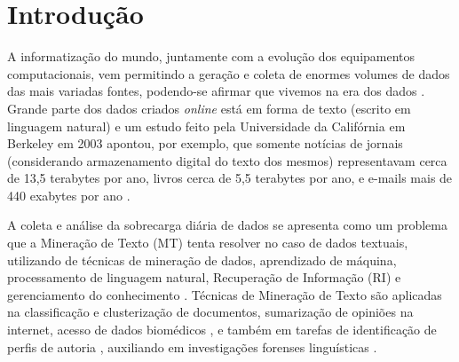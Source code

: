 \chapter{Introdução} \label{ch:Introdução}
    A informatização do mundo, juntamente com a evolução dos equipamentos computacionais, vem permitindo a geração e coleta de enormes volumes de dados das mais variadas fontes, podendo-se afirmar que vivemos na era dos dados \cite[p.~1]{Han:2011:DMC:1972541}.
    Grande parte dos dados criados \textit{online} está em forma de texto (escrito em linguagem natural) e um estudo feito pela Universidade da Califórnia em Berkeley em 2003 apontou, por exemplo, que somente notícias de jornais (considerando armazenamento digital do texto dos mesmos) representavam cerca de 13,5 terabytes por ano, livros cerca de 5,5 terabytes por ano, e e-mails mais de 440 exabytes por ano \cite{lyman2003much} \cite[p.~3]{Zhai2016TDMA}.
    
    A coleta e análise da sobrecarga diária de dados se apresenta como um problema que a Mineração de Texto (MT) tenta resolver no caso de dados textuais, utilizando de técnicas de mineração de dados, aprendizado de máquina, processamento de linguagem natural, Recuperação de Informação (RI) e gerenciamento do conhecimento \cite[p.~1]{Han:2011:DMC:1972541} \cite{Feldman:2006:TMH:1076381} \cite[p.~1241]{Sammut2017EMLDM}.
    Técnicas de Mineração de Texto são aplicadas na classificação e clusterização de documentos, sumarização de opiniões na internet, acesso de dados biomédicos \cite[p.~4--8]{Aggarwal_MTD_2012},
    e também em tarefas de identificação de perfis de autoria\footnotemark{} \cite[p.~906]{rangel2014overview} \cite[p.~6--7]{rangel2018overview}, auxiliando em investigações forenses linguísticas \cite{Chaski_Author_2012}. 
    
    
